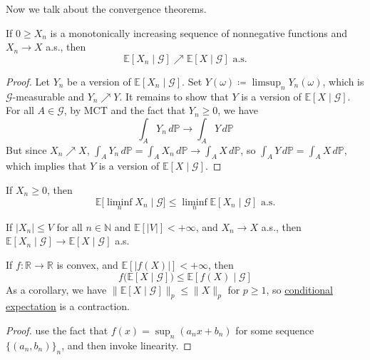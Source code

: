 	Now we talk about the convergence theorems. 

	\begin{theorem}
	  \label{thm:conditional-monotone-convergence-theorem}
	  If $0 \geq X_n$ is a monotonically increasing sequence of nonnegative functions and $X_n \to X$ a.s., then 
		\begin{equation}
			\mathbb{E}[X_n \mid \mathcal{G}] \nearrow \mathbb{E}[X \mid \mathcal{G}] \text{ a.s.}
		\end{equation}
	\end{theorem}
	\begin{proof}
		Let $Y_n$ be a version of $\mathbb{E}[X_n \mid \mathcal{G}]$. Set $Y(\omega) \coloneqq \limsup_n Y_n (\omega)$, which is $\mathcal{G}$-measurable and $Y_n \nearrow Y$. It remains to show that $Y$ is a version of $\mathbb{E}[X \mid \mathcal{G}]$. For all $A \in \mathcal{G}$, by MCT and the fact that $Y_n \geq 0$, we have 
		\begin{equation}
			\int_A Y_n \,d\mathbb{P} \to \int_A Y \,d\mathbb{P}
		\end{equation}
		But since $X_n \nearrow X$, $\int_A Y_n \,d\mathbb{P} = \int_A X_n \,d\mathbb{P} \to \int_A X \,d\mathbb{P}$, so $\int_A Y \, d\mathbb{P} = \int_A X \,d\mathbb{P}$, which implies that $Y$ is a version of $\mathbb{E}[X \mid \mathcal{G}]$. 
	\end{proof}

	\begin{theorem}
	  \label{thm:conditional-fatous-lemma}
	  If $X_n \geq 0$, then 
		\begin{equation}
			\mathbb{E}\big[ \liminf_n X_n \mid \mathcal{G} \big] \leq \liminf_n \mathbb{E}[X_n \mid \mathcal{G}] \text{ a.s.}
		\end{equation}
	\end{theorem}

	\begin{theorem}
	  \label{thm:conditional-dominated-convergence-theorem}
		If $|X_n| \leq V$ for all $n \in \mathbb{N}$ and $\mathbb{E}[|V|] < +\infty$, and $X_n \to X$ a.s., then $\mathbb{E}[X_n \mid \mathcal{G}] \to \mathbb{E}[X \mid \mathcal{G}]$ a.s. 
	\end{theorem}

	\begin{theorem}
	  \label{thm:conditional-jensens-inequality}
		If $f: \mathbb{R} \to \mathbb{R}$ is convex, and $\mathbb{E}[|f(X)|] < +\infty$, then 
		\begin{equation}
			f\big( \mathbb{E}[X \mid \mathcal{G}] \big) \leq \mathbb{E}[f(X) \mid \mathcal{G}]
		\end{equation}
		As a corollary, we have $\|\mathbb{E}[X \mid \mathcal{G}]\|_p \leq \|X\|_p$ for $p \geq 1$, so \hyperref[def:cond-exp]{conditional expectation} is a contraction. 
	\end{theorem}
	\begin{proof}
		use the fact that $f(x) = \sup_n (a_n x + b_n)$ for some sequence $\{(a_n, b_n)\}_n$, and then invoke linearity. 
	\end{proof}

